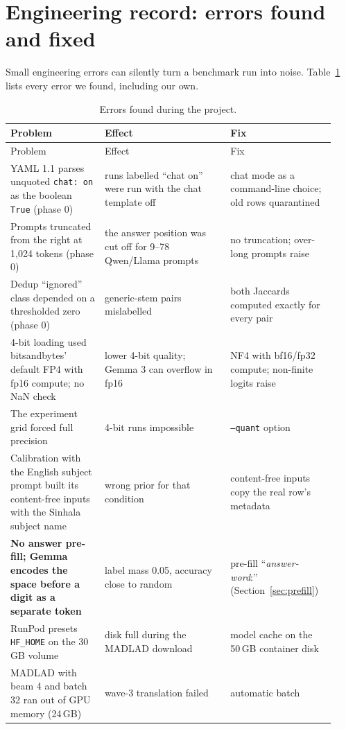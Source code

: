 \documentclass[10pt,a4paper]{article}
\begin{document}
\section{Engineering record: errors found and fixed}\label{sec:bugs}
Small engineering errors can silently turn a benchmark run into noise. Table~\ref{tab:bugs} lists every error we
found, including our own.

{\small
\begin{longtable}{p{0.27\linewidth}p{0.36\linewidth}p{0.3\linewidth}}
\caption{Errors found during the project.}\label{tab:bugs}\\
\toprule
Problem & Effect & Fix\\
\midrule
\endfirsthead
\toprule
Problem & Effect & Fix\\
\midrule
\endhead
YAML 1.1 parses unquoted \texttt{chat: on} as the boolean \texttt{True} (phase 0) & runs labelled ``chat on'' were
run with the chat template off & chat mode as a command-line choice; old rows quarantined\\
Prompts truncated from the right at 1,024 tokens (phase 0) & the answer position was cut off for 9--78 Qwen/Llama
prompts & no truncation; over-long prompts raise\\
Dedup ``ignored'' class depended on a thresholded zero (phase 0) & generic-stem pairs mislabelled & both Jaccards
computed exactly for every pair\\
4-bit loading used bitsandbytes' default FP4 with fp16 compute; no NaN check & lower 4-bit quality; Gemma 3 can
overflow in fp16 & NF4 with bf16/fp32 compute; non-finite logits raise\\
The experiment grid forced full precision & 4-bit runs impossible & \texttt{--quant} option\\
Calibration with the English subject prompt built its content-free inputs with the Sinhala subject name & wrong
prior for that condition & content-free inputs copy the real row's metadata\\
\textbf{No answer pre-fill; Gemma encodes the space before a digit as a separate token} & label mass 0.05, accuracy
close to random & pre-fill ``\textit{answer-word}:\textvisiblespace'' (Section~\ref{sec:prefill})\\
RunPod presets \texttt{HF\_HOME} on the 30\,GB volume & disk full during the MADLAD download & model cache on the
50\,GB container disk\\
MADLAD with beam 4 and batch 32 ran out of GPU memory (24\,GB) & wave-3 translation failed & automatic batch

\end{longtable}}
\end{document}
